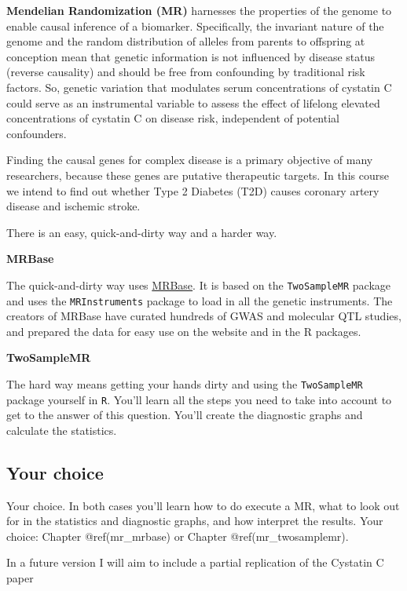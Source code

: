 \documentclass[
]{book}
\newcommand{\passthrough}[1]{#1}
\begin{document}
\textbf{Mendelian Randomization (MR)} harnesses the properties of the genome to enable causal inference of a biomarker. Specifically, the invariant nature of the genome and the random distribution of alleles from parents to offspring at conception mean that genetic information is not influenced by disease status (reverse causality) and should be free from confounding by traditional risk factors\citep{vanderlaan2016}. So, genetic variation that modulates serum concentrations of cystatin C could serve as an instrumental variable to assess the effect of lifelong elevated concentrations of cystatin C on disease risk, independent of potential confounders\citep{vanderlaan2016}.

Finding the causal genes for complex disease is a primary objective of many researchers, because these genes are putative therapeutic targets. In this course we intend to find out whether Type 2 Diabetes (T2D) causes coronary artery disease and ischemic stroke.

There is an easy, quick-and-dirty way and a harder way.

\textbf{MRBase}

The quick-and-dirty way uses \href{http://www.mrbase.org/}{MRBase}. It is based on the \passthrough{\lstinline!TwoSampleMR!} package and uses the \passthrough{\lstinline!MRInstruments!} package to load in all the genetic instruments. The creators of MRBase have curated hundreds of GWAS and molecular QTL studies, and prepared the data for easy use on the website and in the R packages.

\textbf{TwoSampleMR}

The hard way means getting your hands dirty and using the \passthrough{\lstinline!TwoSampleMR!} package yourself in \passthrough{\lstinline!R!}. You'll learn all the steps you need to take into account to get to the answer of this question. You'll create the diagnostic graphs and calculate the statistics.

\hypertarget{your-choice}{%
\subsection{Your choice}\label{your-choice}}

Your choice. In both cases you'll learn how to do execute a MR, what to look out for in the statistics and diagnostic graphs, and how interpret the results. Your choice: Chapter @ref(mr\_mrbase) or Chapter @ref(mr\_twosamplemr).

In a future version I will aim to include a partial replication of the Cystatin C paper\citep{vanderlaan2016}
\end{document}
